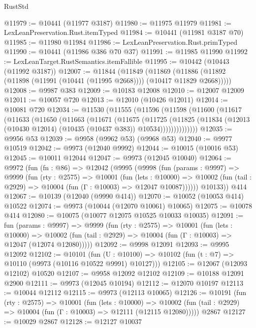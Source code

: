 \begin{lexlean}{RustStd}
\begin{coremodule}
@11979 := @10441 (@11977 @3187)
@11980 := @11975 @11979
@11981 := LexLeanPreservation.Rust.itemTyped
@11984 := @10441 (@11981 @3187 @70)
@11985 := @11980 @11984
@11986 := LexLeanPreservation.Rust.primTyped
@11990 := @10441 (@11986 @386 @70 @37)
@11991 := @11985 @11990
@11992 := LexLeanTarget.RustSemantics.itemFallible
@11995 := @10442 (@10443 (@11992 @3187))
@12007 := @11844
    (@11849
      (@11869 (@11886 (@11892 (@11898 (@11991 (@10441 (@11995 @2668)))) (@10417 @11829 @2668)))))
@12008 := @9987 @383
@12009 := @10183 @12008
@12010 := @12007 @12009
@12011 := @10057 @720
@12013 := @12010 (@10426 @12011)
@12014 := @10081 @720
@12034 := @11530
    (@11555
      (@11596
        (@11598
          (@11600
            (@11617
              (@11633
                (@11650
                  (@11663
                    (@11671
                      (@11675
                        (@11725
                          (@11825
                            (@11834
                              (@12013 (@10430 @12014) (@10435 (@10437 @383)) @10534))))))))))))))
@12035 := @9956 @53
@12039 := @9958 (@9962 @53) (@9968 @53)
@12040 := @9977 @10519
@12042 := @9973 (@12040 @9992)
@12044 := @10015 (@10016 @53)
@12045 := @10011 @12044
@12047 := @9973 (@12045 @10040)
@12064 := @9972
    (fun (fn : @86) =>
    @12042
      (@9995
        (@9998
          (fun (params : @9997) =>
          @9999
            (fun (rty : @2575) =>
            @10001
              (fun (lets : @10000) =>
              @10002 (fun (tail : @2929) => @10004 (fun (Γ : @10003) => @12047 @10087))))))
        @10133))
    @414
@12067 := @10139 (@12040 (@9990 @414))
@12070 := @10052 (@10053 @414) @10522
@12074 := @9973 (@10044 (@12070 @10061) @10065)
@12075 := @10078 @414
@12080 := @10075 (@10077 @12075 @10525 @10033 @10035)
@12091 := fun (params : @9997) =>
  @9999
    (fun (rty : @2575) =>
    @10001
      (fun (lets : @10000) =>
      @10002 (fun (tail : @2929) => @10004 (fun (Γ : @10003) => @12047 (@12074 @12080)))))
@12092 := @9998 @12091
@12093 := @9995 @12092
@12102 := @10101
    (fun (U : @10100) => @10102 (fun (t : @7) => @10110 (@9973 (@10116 @10522 @9991) @10127)))
@12105 := @12067 (@12093 @12102) @10520
@12107 := @9958 @12092 @12102
@12109 := @10188 @12091 @2900
@12111 := @9973 (@12045 @10194)
@12112 := @12070 @10197
@12113 := @10044 @12112
@12115 := @9973 (@12113 @10065)
@12126 := @10191
    (fun (rty : @2575) =>
    @10001
      (fun (lets : @10000) =>
      @10002 (fun (tail : @2929) => @10004 (fun (Γ : @10003) => @12111 (@12115 @12080)))))
    @2867
@12127 := @10029 @2867
@12128 := @12127 @10037

\end{coremodule}
\end{lexlean}
